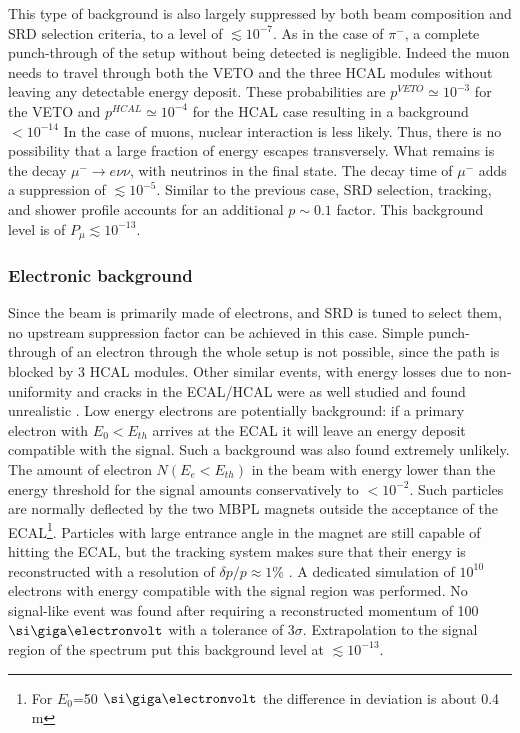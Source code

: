 This type of background is also largely suppressed by both beam composition and SRD selection criteria, to a level of
$\lesssim 10^{-7}$. As in the case of $\pi^-$, a complete punch-through of the setup without being detected is negligible. Indeed the muon needs to travel through both the VETO and the three HCAL modules without leaving any detectable energy deposit. These probabilities are $p^{VETO} \simeq 10^{-3}$ for the VETO and $p^{HCAL} \simeq 10^{-4}$ for the HCAL case resulting in a background $< 10^{-14}$
In the case of muons, nuclear interaction is less likely. Thus, there is no possibility that a large fraction of energy escapes transversely. 
What remains is the decay $\mu^- \rightarrow e\nu\nu$, with neutrinos in the final state. The decay time of $\mu^-$ adds a suppression of $\lesssim 10^{-5}$. Similar to the previous case, SRD selection, tracking, and shower profile accounts for an additional $p\sim 0.1$ factor. This background level is of $P_{\mu} \lesssim 10^{-13}$.

\subsubsection{Electronic background}
\label{ch3:sec:bkg:inv:elec}

Since the beam is primarily made of electrons, and SRD is tuned to select them, no upstream suppression factor can be achieved in this case. Simple punch-through of an electron through the whole setup is not possible, since the path is blocked by 3 HCAL modules. Other similar events, with energy losses due to non-uniformity and cracks in the ECAL/HCAL were as well studied and found unrealistic \cite{Andreas:2013lya}. Low energy electrons are potentially background: if a primary electron with $E_0 < E_{th}$ arrives at the ECAL it will leave an energy deposit compatible with the signal. Such a background was also found extremely unlikely. The amount of electron $N(E_e<E_{th})$ in the beam with energy lower than the energy threshold for the signal amounts conservatively to $<10^{-2}$. Such particles are normally deflected by the two MBPL magnets outside the acceptance of the ECAL\footnote{For $E_0$=50 $\gev$ the difference in deviation is about 0.4 \si{\meter}}. Particles with large entrance angle in the magnet are still capable of hitting the ECAL, but the tracking system makes sure that their energy is reconstructed with a resolution of $\delta p/p \approx 1\%$ \cite{Banerjee:2017mdu}. A dedicated simulation of $10^{10}$ electrons with energy compatible with the signal region was performed. No signal-like event was found after requiring a reconstructed momentum of 100 $\gev$ with a tolerance of 3$\sigma$. Extrapolation to the signal region of the spectrum put this background level at $\lesssim 10^{-13}$.

